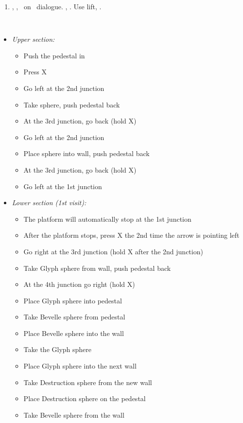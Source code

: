 \begin{enumerate}[resume]
	\item \sd, \skippablefmv[1:30], \sd\ on \yuna\ dialogue. \skippablefmv[30], \sd. Use lift, \sd.
\end{enumerate}
\bothvfill
\winvfill
\lossvfill
\ 
\begin{trial}
	\begin{itemize}
		\item \textit{Upper section:}
			\begin{itemize}
				\item Push the pedestal in
				\item Press X
				\item Go left at the 2nd junction
				\item Take sphere, push pedestal back
				\item At the 3rd junction, go back (hold X)
				\item Go left at the 2nd junction
				\item Place sphere into wall, push pedestal back
				\item At the 3rd junction, go back (hold X)
				\item Go left at the 1st junction
			\end{itemize}
		\item \textit{Lower section (1st visit):}
			\begin{itemize}
				\item The platform will automatically stop at the 1st junction
				\item After the platform stops, press X the 2nd time the arrow is pointing left
				\item Go right at the 3rd junction (hold X after the 2nd junction)
				\item Take Glyph sphere from wall, push pedestal back
				\item At the 4th junction go right (hold X)
				\item Place Glyph sphere into pedestal
				\item Take Bevelle sphere from pedestal
				\item Place Bevelle sphere into the wall
				\item Take the Glyph sphere
				\item Place Glyph sphere into the next wall
				\item Take Destruction sphere from the new wall
				\item Place Destruction sphere on the pedestal
				\item Take Bevelle sphere from the wall

\end{itemize}
\end{itemize}
\end{trial}
